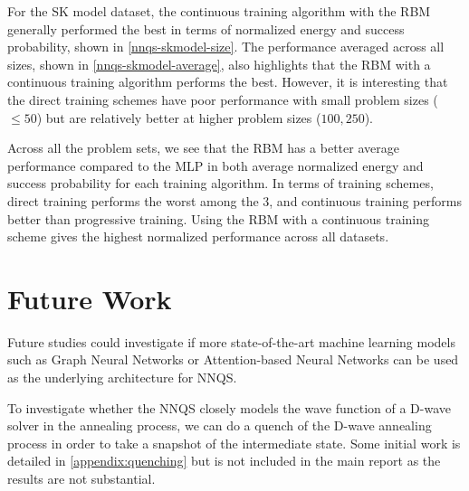 For the SK model dataset, the continuous training algorithm with the RBM generally performed the best in terms of normalized energy and success probability, shown in \autoref{nnqs-skmodel-size}. The performance averaged across all sizes, shown in \autoref{nnqs-skmodel-average}, also highlights that the RBM with a continuous training algorithm performs the best. However, it is interesting that the direct training schemes have poor performance with small problem sizes ($\leq 50$) but are relatively better at higher problem sizes ($100, 250$).

Across all the problem sets, we see that the RBM has a better average performance compared to the MLP in both average normalized energy and success probability for each training algorithm. In terms of training schemes, direct training performs the worst among the 3, and continuous training performs better than progressive training. Using the RBM with a continuous training scheme gives the highest normalized performance across all datasets.

\section{Future Work}
Future studies could investigate if more state-of-the-art machine learning models such as Graph Neural Networks or Attention-based Neural Networks can be used as the underlying architecture for NNQS.

To investigate whether the NNQS closely models the wave function of a D-wave solver in the annealing process, we can do a quench of the D-wave annealing process in order to take a snapshot of the intermediate state. Some initial work is detailed in \autoref{appendix:quenching} but is not included in the main report as the results are not substantial.